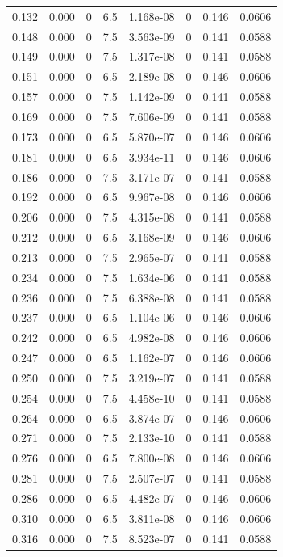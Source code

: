 \documentclass[preview]{standalone}
\begin{document}
{{\begin{tabular}{L{1.2cm}C{1.2cm} C{0.3cm}C{0.5cm} C{1.4cm}C{1.4cm} C{1.4cm}C{1.4cm}}
  0.132  &  0.000  & 0     & 6.5 &  1.168e-08  & 0  & 0.146 &  0.0606   \\ 
  0.148  &  0.000  & 0     & 7.5 &  3.563e-09  & 0  & 0.141 &  0.0588   \\ 
  0.149  &  0.000  & 0     & 7.5 &  1.317e-08  & 0  & 0.141 &  0.0588   \\ 
  0.151  &  0.000  & 0     & 6.5 &  2.189e-08  & 0  & 0.146 &  0.0606   \\ 
  0.157  &  0.000  & 0     & 7.5 &  1.142e-09  & 0  & 0.141 &  0.0588   \\ 
  0.169  &  0.000  & 0     & 7.5 &  7.606e-09  & 0  & 0.141 &  0.0588   \\ 
  0.173  &  0.000  & 0     & 6.5 &  5.870e-07  & 0  & 0.146 &  0.0606   \\ 
  0.181  &  0.000  & 0     & 6.5 &  3.934e-11  & 0  & 0.146 &  0.0606   \\ 
  0.186  &  0.000  & 0     & 7.5 &  3.171e-07  & 0  & 0.141 &  0.0588   \\ 
  0.192  &  0.000  & 0     & 6.5 &  9.967e-08  & 0  & 0.146 &  0.0606   \\ 
  0.206  &  0.000  & 0     & 7.5 &  4.315e-08  & 0  & 0.141 &  0.0588   \\ 
  0.212  &  0.000  & 0     & 6.5 &  3.168e-09  & 0  & 0.146 &  0.0606   \\ 
  0.213  &  0.000  & 0     & 7.5 &  2.965e-07  & 0  & 0.141 &  0.0588   \\ 
  0.234  &  0.000  & 0     & 7.5 &  1.634e-06  & 0  & 0.141 &  0.0588   \\ 
  0.236  &  0.000  & 0     & 7.5 &  6.388e-08  & 0  & 0.141 &  0.0588   \\ 
  0.237  &  0.000  & 0     & 6.5 &  1.104e-06  & 0  & 0.146 &  0.0606   \\ 
  0.242  &  0.000  & 0     & 6.5 &  4.982e-08  & 0  & 0.146 &  0.0606   \\ 
  0.247  &  0.000  & 0     & 6.5 &  1.162e-07  & 0  & 0.146 &  0.0606   \\ 
  0.250  &  0.000  & 0     & 7.5 &  3.219e-07  & 0  & 0.141 &  0.0588   \\ 
  0.254  &  0.000  & 0     & 7.5 &  4.458e-10  & 0  & 0.141 &  0.0588   \\ 
  0.264  &  0.000  & 0     & 6.5 &  3.874e-07  & 0  & 0.146 &  0.0606   \\ 
  0.271  &  0.000  & 0     & 7.5 &  2.133e-10  & 0  & 0.141 &  0.0588   \\ 
  0.276  &  0.000  & 0     & 6.5 &  7.800e-08  & 0  & 0.146 &  0.0606   \\ 
  0.281  &  0.000  & 0     & 7.5 &  2.507e-07  & 0  & 0.141 &  0.0588   \\ 
  0.286  &  0.000  & 0     & 6.5 &  4.482e-07  & 0  & 0.146 &  0.0606   \\ 
  0.310  &  0.000  & 0     & 6.5 &  3.811e-08  & 0  & 0.146 &  0.0606   \\ 
  0.316  &  0.000  & 0     & 7.5 &  8.523e-07  & 0  & 0.141 &  0.0588   \\ 
\hline 
\end{tabular} 

}}
\end{document}
